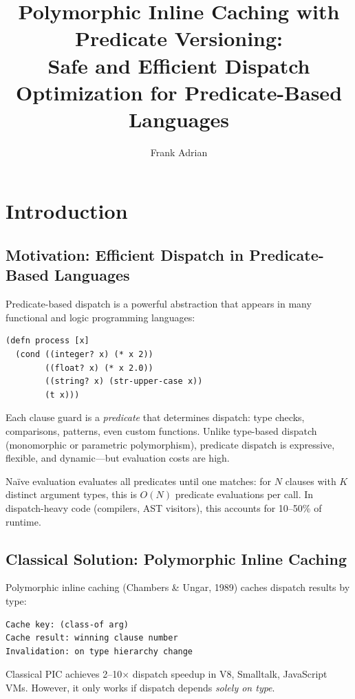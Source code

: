 \documentclass[sigplan,review,anonymous]{acmart}
\title{Polymorphic Inline Caching with Predicate Versioning:\\
Safe and Efficient Dispatch Optimization for Predicate-Based Languages}
\author{Frank Adrian}
\affiliation{%
  \institution{FOL Language Team}
  \city{San Francisco}
  \country{USA}}
\begin{document}
\maketitle

\section{Introduction}

\subsection{Motivation: Efficient Dispatch in Predicate-Based Languages}

Predicate-based dispatch is a powerful abstraction that appears in many functional and logic programming languages:

\begin{lstlisting}
(defn process [x]
  (cond ((integer? x) (* x 2))
        ((float? x) (* x 2.0))
        ((string? x) (str-upper-case x))
        (t x)))
\end{lstlisting}

Each clause guard is a \emph{predicate} that determines dispatch: type checks, comparisons, patterns, even custom functions. Unlike type-based dispatch (monomorphic or parametric polymorphism), predicate dispatch is expressive, flexible, and dynamic---but evaluation costs are high.

Naïve evaluation evaluates all predicates until one matches: for $N$ clauses with $K$ distinct argument types, this is $O(N)$ predicate evaluations per call. In dispatch-heavy code (compilers, AST visitors), this accounts for 10--50\% of runtime.

\subsection{Classical Solution: Polymorphic Inline Caching}

Polymorphic inline caching (Chambers \& Ungar, 1989) caches dispatch results by type:

\begin{lstlisting}
Cache key: (class-of arg)
Cache result: winning clause number
Invalidation: on type hierarchy change
\end{lstlisting}

Classical PIC achieves 2--10$\times$ dispatch speedup in V8, Smalltalk, JavaScript VMs. However, it only works if dispatch depends \emph{solely on type}.
\end{document}
